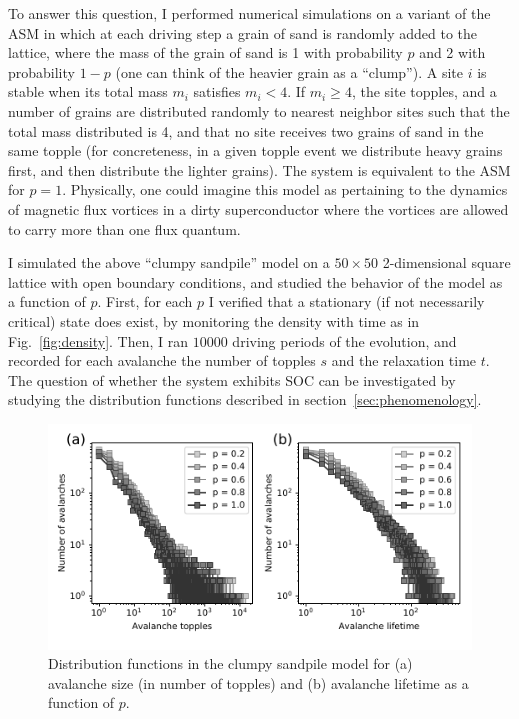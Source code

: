 \documentclass[aps,prb,reprint,superscriptaddress]{revtex4-2}
\begin{document}
To answer this question, I performed numerical simulations on a variant of the ASM in which at each driving step a grain of sand is randomly added to the lattice, where the mass of the grain of sand is 1 with probability $p$ and 2 with probability $1-p$ (one can think of the heavier grain as a ``clump''). A site $i$ is stable when its total mass $m_i$ satisfies $m_i < 4$. If $m_i \geq 4$, the site topples, and a number of grains are distributed randomly to nearest neighbor sites such that the total mass distributed is 4, and that no site receives two grains of sand in the same topple (for concreteness, in a given topple event we distribute heavy grains first, and then distribute the lighter grains). The system is equivalent to the ASM for $p = 1$. Physically, one could imagine this model as pertaining to the dynamics of magnetic flux vortices in a dirty superconductor where the vortices are allowed to carry more than one flux quantum.

I simulated the above ``clumpy sandpile'' model on a $50 \times 50$ 2-dimensional square lattice with open boundary conditions, and studied the behavior of the model as a function of $p$. First, for each $p$ I verified that a stationary (if not necessarily critical) state does exist, by monitoring the density with time as in Fig.~\ref{fig:density}. Then, I ran $10000$ driving periods of the evolution, and recorded for each avalanche the number of topples $s$ and the relaxation time $t$. The question of whether the system exhibits SOC can be investigated by studying the distribution functions described in section~\ref{sec:phenomenology}.

\begin{figure}
\includegraphics{avalanches_p}
\caption{\label{fig:avalanches_p} Distribution functions in the clumpy sandpile model for (a) avalanche size (in number of topples) and (b) avalanche lifetime as a function of $p$.}
\end{figure}
\end{document}
